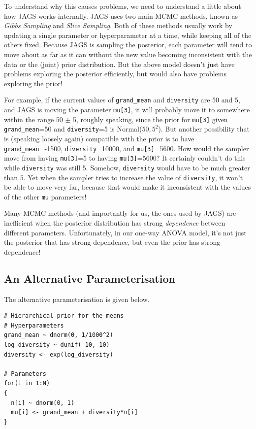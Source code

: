 To understand why this causes problems, we need to understand a little about
how JAGS works internally. JAGS uses two main MCMC methods, known as
{\it Gibbs Sampling} and {\it Slice Sampling}. Both of these methods usually
work by updating a single parameter or hyperparameter at a time, while keeping
all of the others fixed. Because JAGS is sampling the posterior, each
parameter will tend to move about as far as it can without the new value
becoming inconsistent with the data or the (joint) prior distribution. But
the above model doesn't just have problems exploring the posterior efficiently,
but would also have problems exploring the prior!

For example, if the current values of {\tt grand\_mean} and {\tt diversity}
are 50 and 5, and JAGS is moving the parameter {\tt mu[3]}, it will probably
move it to somewhere within the range 50 $\pm$ 5, roughly speaking, since
the prior for {\tt mu[3]} given {\tt grand\_mean}=50 and {\tt diversity}=5
is Normal($50, 5^2$). But another possibility that is (speaking loosely again)
compatible with the prior is to have {\tt grand\_mean}=-1500,
{\tt diversity}=10000, and {\tt mu[3]}=5600. How would the sampler move from
having {\tt mu[3]}=5 to having {\tt mu[3]}=5600? It certainly couldn't do this
while {\tt diversity} was still 5. Somehow, {\tt diversity} would have to be
much greater than 5. Yet when the sampler tries to increase the value of
{\tt diversity}, it won't be able to move very far, because that would make
it inconsistent with the values of the other {\tt mu} parameters!

Many MCMC methods (and importantly for us, the ones used by JAGS)
are inefficient when the posterior distribution has strong
{\it dependence} between different parameters. Unfortunately, in our one-way
ANOVA model, it's not just the posterior that has strong dependence, but
even the prior has strong dependence!

\subsection{An Alternative Parameterisation}


The alternative parameterisation is given below.

\begin{verbatim}
# Hierarchical prior for the means
# Hyperparameters
grand_mean ~ dnorm(0, 1/1000^2)
log_diversity ~ dunif(-10, 10)
diversity <- exp(log_diversity)

# Parameters
for(i in 1:N)
{
  n[i] ~ dnorm(0, 1)
  mu[i] <- grand_mean + diversity*n[i]
}
\end{verbatim}




